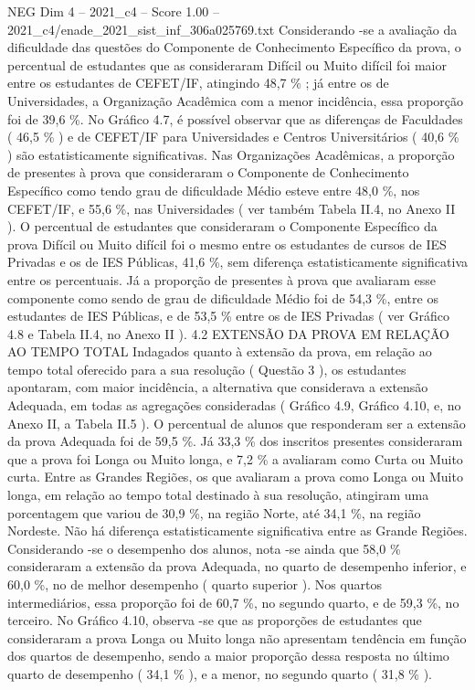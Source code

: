 \begin{textsample}{NEG Dim 4 – 2021\_c4 – Score 1.00 – 2021\_c4/enade\_2021\_sist\_inf\_306a025769.txt}
Considerando -se a avaliação da dificuldade das questões do Componente de Conhecimento Específico da prova, o percentual de estudantes que as consideraram Difícil ou Muito difícil foi maior entre os estudantes de CEFET/IF, atingindo 48,7 \% ; já entre os de Universidades, a Organização Acadêmica com a menor incidência, essa proporção foi de 39,6 \%.
No Gráfico 4.7, é possível observar que as diferenças de Faculdades ( 46,5 \% ) e de CEFET/IF para Universidades e Centros Universitários ( 40,6 \% ) são estatisticamente significativas.
Nas Organizações Acadêmicas, a proporção de presentes à prova que consideraram o Componente de Conhecimento Específico como tendo grau de dificuldade Médio esteve entre 48,0 \%, nos CEFET/IF, e 55,6 \%, nas Universidades ( ver também Tabela II.4, no Anexo II ).
O percentual de estudantes que consideraram o Componente Específico da prova Difícil ou Muito difícil foi o mesmo entre os estudantes de cursos de IES Privadas e os de IES Públicas, 41,6 \%, sem diferença estatisticamente significativa entre os percentuais.
Já a proporção de presentes à prova que avaliaram esse componente como sendo de grau de dificuldade Médio foi de 54,3 \%, entre os estudantes de IES Públicas, e de 53,5 \% entre os de IES Privadas ( ver Gráfico 4.8 e Tabela II.4, no Anexo II ). 4.2 EXTENSÃO DA PROVA EM RELAÇÃO AO TEMPO TOTAL Indagados quanto à extensão da prova, em relação ao tempo total oferecido para a sua resolução ( Questão 3 ), os estudantes apontaram, com maior incidência, a alternativa que considerava a extensão Adequada, em todas as agregações consideradas ( Gráfico 4.9, Gráfico 4.10, e, no Anexo II, a Tabela II.5 ).
O percentual de alunos que responderam ser a extensão da prova Adequada foi de 59,5 \%.
Já 33,3 \% dos inscritos presentes consideraram que a prova foi Longa ou Muito longa, e 7,2 \% a avaliaram como Curta ou Muito curta.
Entre as Grandes Regiões, os que avaliaram a prova como Longa ou Muito longa, em relação ao tempo total destinado à sua resolução, atingiram uma porcentagem que variou de 30,9 \%, na região Norte, até 34,1 \%, na região Nordeste.
Não há diferença estatisticamente significativa entre as Grande Regiões.
Considerando -se o desempenho dos alunos, nota -se ainda que 58,0 \% consideraram a extensão da prova Adequada, no quarto de desempenho inferior, e 60,0 \%, no de melhor desempenho ( quarto superior ).
Nos quartos intermediários, essa proporção foi de 60,7 \%, no segundo quarto, e de 59,3 \%, no terceiro.
No Gráfico 4.10, observa -se que as proporções de estudantes que consideraram a prova Longa ou Muito longa não apresentam tendência em função dos quartos de desempenho, sendo a maior proporção dessa resposta no último quarto de desempenho ( 34,1 \% ), e a menor, no segundo quarto ( 31,8 \% ).

\end{textsample}
